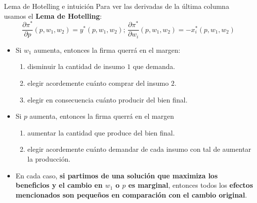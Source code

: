 \documentclass{beamer}
\theoremstyle{definition}
\begin{document}
\begin{frame}{Lema de Hotelling e intuición}\small
Para ver las derivadas de la última columna usamos el \textbf{Lema de Hotelling}:
		\begin{equation*}
		\frac{\partial \pi^*}{\partial p}(p,w_{1},w_{2})=y^*(p,w_{1},w_{2}); \, \frac{\partial \pi^*}{\partial w_{i}}(p,w_{1},w_{2})=-x_{i}^*(p,w_{1},w_{2})
		\end{equation*}
    \begin{itemize}
        \item Si $w_1$ aumenta, entonces la firma querrá en el margen:
        \begin{enumerate}
            \item disminuir la cantidad de insumo $1$ que demanda.
            \item elegir acordemente cuánto comprar del insumo $2$.
            \item elegir en consecuencia cuánto producir del bien final.
        \end{enumerate}
        \item Si $p$ aumenta, entonces la firma querrá en el margen
                \begin{enumerate}
                 \item aumentar la cantidad que produce del bien final.
            \item elegir acordemente cuánto demandar de cada insumo con tal de aumentar la producción.
        \end{enumerate}
    \item En cada caso, \textbf{si partimos de una solución que maximiza los beneficios y el cambio en $w_1$ o $p$ es marginal}, entonces todos los \textbf{efectos mencionados son pequeños en comparación con el cambio original}. %
    \end{itemize}
\end{frame}
\end{document}
